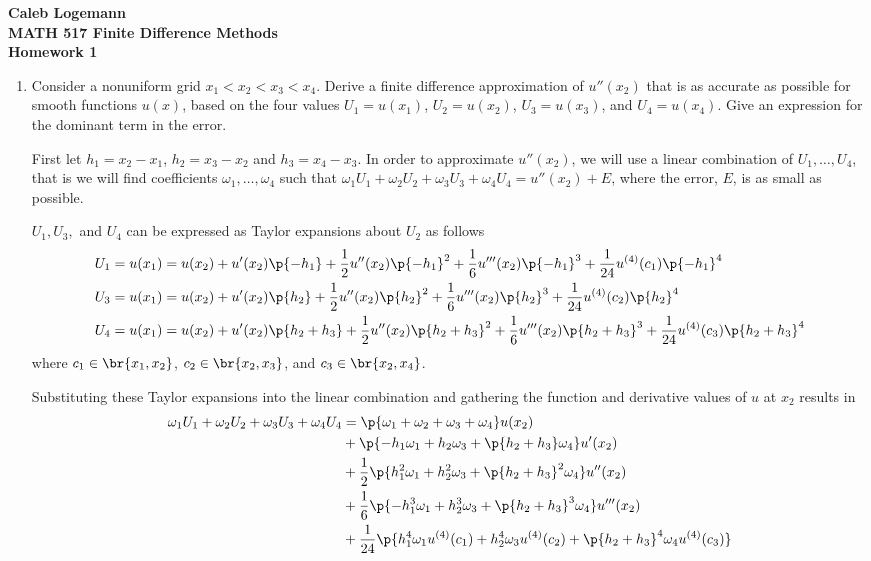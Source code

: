 \documentclass[11pt, oneside]{article}
\begin{document}
\noindent \textbf{\Large{Caleb Logemann \\
MATH 517 Finite Difference Methods \\
Homework 1
}}

%
\begin{enumerate}
    \item %
        Consider a nonuniform grid $x_1 < x_2 < x_3 < x_4$.
        Derive a finite difference approximation of $u''(x_2)$ that is as
        accurate as possible for smooth functions $u(x)$, based on the four
        values $U_1 = u(x_1)$, $U_2 = u(x_2)$, $U_3 = u(x_3)$, and
        $U_4 = u(x_4)$.
        Give an expression for the dominant term in the error.

        First let $h_1 = x_2 - x_1$, $h_2 = x_3 - x_2$ and $h_3 = x_4 - x_3$.
        In order to approximate $u''(x_2)$, we will use a linear combination of
        $U_1, \ldots, U_4$, that is we will find coefficients
        $\omega_1, \ldots, \omega_4$ such that
        $\omega_1 U_1 + \omega_2 U_2 + \omega_3 U_3 + \omega_4 U_4 = u''(x_2) + E$,
        where the error, $E$, is as small as possible.

        $U_1, U_3,$ and $U_4$ can be expressed as Taylor expansions about $U_2$
        as follows
        \begin{align*}
            U_1 &= u(x_1) = u(x_2) + u'(x_2)\p{-h_1} + \frac{1}{2} u''(x_2)
                \p{-h_1}^2 + \frac{1}{6} u'''(x_2) \p{-h_1}^3 +
                \frac{1}{24} u^{(4)}(c_1) \p{-h_1}^4 \\
            U_3 &= u(x_1) = u(x_2) + u'(x_2)\p{h_2} + \frac{1}{2} u''(x_2)
                \p{h_2}^2 + \frac{1}{6} u'''(x_2) \p{h_2}^3 +
                \frac{1}{24} u^{(4)}(c_2) \p{h_2}^4 \\
            U_4 &= u(x_1) = u(x_2) + u'(x_2)\p{h_2 + h_3} + \frac{1}{2} u''(x_2)
                \p{h_2 + h_3}^2 + \frac{1}{6} u'''(x_2) \p{h_2 + h_3}^3 +
                \frac{1}{24} u^{(4)}(c_3) \p{h_2 + h_3}^4
        \end{align*}
        where $c_1 \in \br{x_1, x_2}$, $c_2 \in \br{x_2, x_3}$, and
        $c_3 \in \br{x_2, x_4}$.

        Substituting these Taylor expansions into the linear combination and
        gathering the function and derivative values of $u$ at $x_2$ results in
        \begin{align*}
            \omega_1 U_1 + \omega_2 U_2 + \omega_3 U_3 + \omega_4 U_4 &=
                \p{\omega_1 + \omega_2 + \omega_3 + \omega_4} u(x_2) \\
                &+ \p{-h_1 \omega_1 + h_2 \omega_3 + \p{h_2 + h_3} \omega_4} u'(x_2) \\
                &+ \frac{1}{2}\p{h_1^2 \omega_1 + h_2^2 \omega_3 + \p{h_2 + h_3}^2 \omega_4} u''(x_2) \\
                &+ \frac{1}{6}\p{-h_1^3 \omega_1 + h_2^3 \omega_3 + \p{h_2 + h_3}^3 \omega_4} u'''(x_2) \\
                &+ \frac{1}{24}\p{h_1^4 \omega_1 u^{(4)}(c_1) + h_2^4 \omega_3 u^{(4)}(c_2)+ \p{h_2 + h_3}^4 \omega_4 u^{(4)}(c_3)}
        \end{align*}


\end{enumerate}
\end{document}
